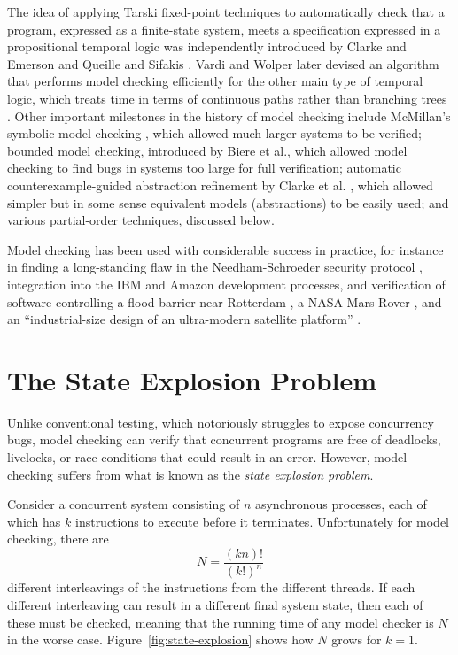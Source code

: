 \documentclass[12pt,a4paper,twoside,openany]{report}
\begin{document}
The idea of applying Tarski
fixed-point techniques \cite{tar55}
to automatically check that a
program, expressed as a finite-state
system, meets a specification
expressed in a propositional
temporal logic was independently introduced
by Clarke and Emerson \cite{cla82} and
Queille and Sifakis \cite{que82}. Vardi and
Wolper later devised an algorithm that
performs model checking efficiently
for the other main type of temporal
logic, which treats time in terms
of continuous paths rather than branching
trees \cite{var96}.
Other important
milestones in the history of model
checking include McMillan's
symbolic model checking \cite{mcm93},
which allowed much larger
systems to be verified;
bounded model checking, introduced by
Biere et al.\@ \cite{bie99},
which allowed model checking
to find bugs in systems too large for full
verification; automatic counterexample-guided
abstraction refinement by Clarke et al.\@
\cite{cla00}, which allowed simpler but
in some sense equivalent models
(abstractions) to be easily used; and
various partial-order techniques, discussed
below.

Model checking has been used with considerable
success in practice, for instance in finding
a long-standing flaw in the Needham-Schroeder
security protocol \cite{low96},
integration into the IBM \cite{sch97} and Amazon
\cite{new15}
development processes,
and verification of
software controlling a flood barrier near
Rotterdam \cite{kars96},
a NASA Mars Rover \cite{brat04},
and an ``industrial-size design of an
ultra-modern satellite platform'' \cite{est12}.

\section{The State Explosion Problem}

Unlike conventional testing, which notoriously
struggles to expose concurrency bugs,
model checking can verify that concurrent
programs are free of deadlocks, livelocks, or
race conditions that could result in
an error. However, model checking
suffers from what is known as the
\textit{state explosion problem}.

Consider a concurrent system consisting
of $n$ asynchronous processes, each of which
has $k$ instructions to execute before it
terminates. Unfortunately for model checking,
there are
\[N =\frac{(kn)!}{(k!)^n}\]
different interleavings of the instructions
from the different threads.
If each different interleaving
can result in a different final system state,
then each of these must be checked,
meaning that the running time of any model
checker is $N$ in
the worse case.
Figure~\ref{fig:state-explosion} shows
how $N$ grows for $k = 1$.
\end{document}
